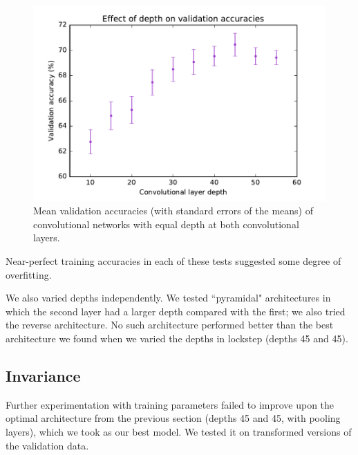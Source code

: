 \documentclass{article}
\begin{document}
\begin{multicols}{2}
\begin{figure}[t]
   \centering
   \includegraphics[width=4.5in]{img/2-5-conv-depth-val-acc.pdf}
   \caption{Mean validation accuracies (with standard errors of the means)
       of convolutional networks with equal depth at both convolutional layers.}
   \label{fig:2-5-conv-depth-val-acc}
\end{figure}

Near-perfect training accuracies in each of these tests
suggested some degree of overfitting.



We also varied depths independently.
We tested ``pyramidal" architectures
in which the second layer had a larger depth
compared with the first;
we also tried the reverse architecture.
No such architecture performed better
than the best architecture we found when
we varied the depths in lockstep (depths 45 and 45).


\subsection{Invariance}

Further experimentation with training parameters
failed to improve upon
the optimal architecture from the previous section
(depths 45 and 45, with pooling layers),
which we took as our best model.
We tested it on transformed versions of the validation data.


\end{multicols}
\end{document}

